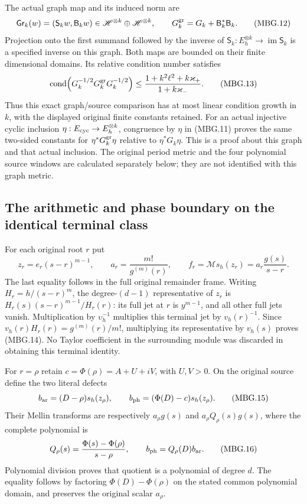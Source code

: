 The actual graph map and its induced norm are
\[
 \mathsf{Gr}_k(w)=(\mathsf S_k w,\mathsf B_k w)
       \in\mathscr H^{\otimes k}\oplus\mathscr H^{\otimes k},\qquad
 G_k^{\rm gr}=G_k+\mathsf B_k^*\mathsf B_k .
 \tag{MBG.12}\label{GraphV2:eq:mbg-graph}
\]
Projection onto the first summand followed by the inverse of
\(\mathsf S_k:E_h^{\otimes k}\to\operatorname{im}\mathsf S_k\)
is a specified inverse on this graph. Both maps are bounded on their
finite dimensional domains. Its relative condition number satisfies
\[
 \operatorname{cond}\!\left(G_k^{-1/2}G_k^{\rm gr}G_k^{-1/2}\right)
 \le
 \frac{1+k^2\ell^2+k\varkappa_+}{1+k\varkappa_-}.
 \tag{MBG.13}\label{GraphV2:eq:mbg-graph-condition}
\]
Thus this exact graph/source comparison has at most linear condition
growth in \(k\), with the displayed original finite constants retained.
For an actual injective cyclic inclusion \(\eta:E_{\rm cyc}\to
E_h^{\otimes k}\), congruence by \(\eta\) in (MBG.11) proves the same
two-sided constants for
\(\eta^*G_k^{\rm gr}\eta\) relative to \(\eta^*G_k\eta\).
This is a proof about this graph and that actual inclusion. The original
period metric and the four polynomial source windows are calculated
separately below; they are not identified with this graph metric.

\subsection{The arithmetic and phase boundary on the identical terminal class}

For each original root \(r\) put
\[
 z_r=e_r(s-r)^{m-1},\qquad
 a_r=\frac{m!}{g^{(m)}(r)},\qquad
 f_r=\mathcal M s_h(z_r)=a_r\frac{g(s)}{s-r}.
 \tag{MBG.14}\label{GraphV2:eq:mbg-terminal}
\]
The last equality follows in the full original remainder frame.
Writing \(H_r=h/(s-r)^m\), the degree-\((d-1)\) representative of
\(z_r\) is \(H_r(s)(s-r)^{m-1}/H_r(r)\): its full jet at \(r\)
is \(y^{m-1}\), and all other full jets vanish. Multiplication by
\(\upsilon_h^{-1}\) multiplies this terminal jet by \(v_h(r)^{-1}\).
Since \(v_h(r)H_r(r)=g^{(m)}(r)/m!\), multiplying its representative
by \(v_h(s)\) proves (MBG.14). No Taylor coefficient in the surrounding
module was discarded in obtaining this terminal identity.

For \(r=\rho\) retain \(c=\Phi(\rho)=A+U+iV\), with \(U,V>0\).
On the original source define the two literal defects
\[
 b_{\rm ar}=(D-\rho)s_h(z_\rho),\qquad
 b_{\rm ph}=(\Phi(D)-c)s_h(z_\rho).
 \tag{MBG.15}\label{GraphV2:eq:mbg-two-defects}
\]
Their Mellin transforms are respectively \(a_\rho g(s)\) and
\(a_\rho Q_\rho(s)g(s)\), where the complete polynomial is
\[
 Q_\rho(s)=\frac{\Phi(s)-\Phi(\rho)}{s-\rho},\qquad
 b_{\rm ph}=Q_\rho(D)b_{\rm ar}.
 \tag{MBG.16}\label{GraphV2:eq:mbg-divided-difference}
\]
Polynomial division proves that quotient is a polynomial of degree
\(d\). The equality follows by factoring \(\Phi(D)-\Phi(\rho)\)
on the stated common polynomial domain, and preserves the original
scalar \(a_\rho\).

